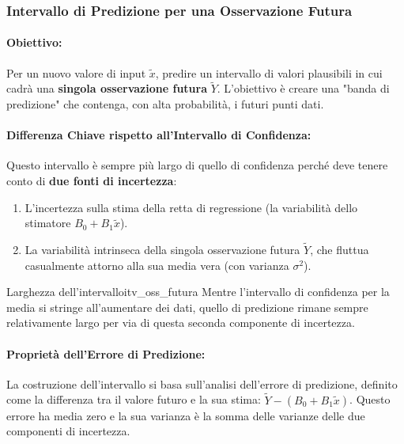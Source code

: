 \subsubsection{Intervallo di Predizione per una Osservazione Futura}

\paragraph{Obiettivo:} Per un nuovo valore di input \(\tilde{x}\), predire un
intervallo di valori plausibili in cui cadrà una \textbf{singola osservazione
	futura} \(\tilde{Y}\). L'obiettivo è creare una "banda di predizione" che
contenga, con alta probabilità, i futuri punti dati.

\paragraph{Differenza Chiave rispetto all'Intervallo di Confidenza:}
Questo intervallo è sempre più largo di quello di confidenza perché deve
tenere conto di \textbf{due fonti di incertezza}:
\begin{enumerate}
	\item L'incertezza sulla stima della retta di regressione (la variabilità
	      dello stimatore \(B_0 + B_1\tilde{x}\)).
	\item La variabilità intrinseca della singola osservazione futura
	      \(\tilde{Y}\), che fluttua casualmente attorno alla sua media vera (con
	      varianza \(\sigma^2\)).
\end{enumerate}

\begin{nota}{Larghezza dell'intervallo}{itv_oss_futura}
	Mentre l'intervallo di confidenza per la media si stringe all'aumentare dei
	dati, quello di predizione rimane sempre relativamente largo per via di
	questa seconda componente di incertezza.
\end{nota}

\paragraph{Proprietà dell'Errore di Predizione:} La costruzione dell'intervallo
si basa sull'analisi dell'errore di predizione, definito come la differenza tra
il valore futuro e la sua stima: \( \tilde{Y} - (B_0 + B_1\tilde{x}) \). Questo
errore ha media zero e la sua varianza è la somma delle varianze delle due
componenti di incertezza.

